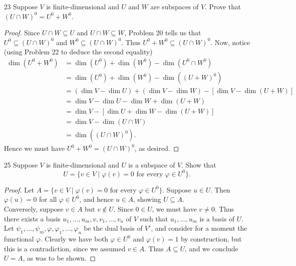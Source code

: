 \documentclass{extarticle}
\newenvironment{problem}[1]{\begin{prob*}{#1}{}}{\end{prob*}}
\begin{document}
\begin{problem}{23}
Suppose $V$ is finite-dimensional and $U$ and $W$ are subspaces of $V$.  Prove that $(U\cap W)^0 = U^0 + W^0$.  
\end{problem}
\begin{proof}
Since $U\cap W\subseteq U$ and $U\cap W \subseteq W$, Problem 20 tells us that $U^0\subseteq (U\cap W)^0$ and $W^0\subseteq (U\cap W)^0$.  Thus $U^0 + W^0\subseteq (U\cap W)^0$.  Now, notice (using Problem 22 to deduce the second equality)
\begin{align*}
\dim(U^0 + W^0) &= \dim(U^0) + \dim(W^0) - \dim(U^0\cap W^0)\\
&= \dim(U^0) + \dim(W^0) - \dim((U+W)^0)\\
&= (\dim V - \dim U) + (\dim V - \dim W) - [\dim V - \dim(U + W)]\\
&= \dim V - \dim U - \dim W + \dim(U + W)\\
&= \dim V - [\dim U + \dim W - \dim(U+W)]\\
&= \dim V - \dim (U\cap W)\\
&= \dim((U\cap W)^0).
\end{align*}
Hence we must have $U^0 + W^0 = (U\cap W)^0$, as desired.
\end{proof}

\begin{problem}{25}
Suppose $V$ is finite-dimensional and $U$ is a subspace of $V$.  Show that
\begin{equation*}
U = \{v\in V\mid \varphi(v) = 0\text{ for every }\varphi\in U^0\}.
\end{equation*}
\end{problem}
\begin{proof}
Let $A = \{v\in V\mid \varphi(v) = 0\text{ for every }\varphi\in U^0\}$.  Suppose $u\in U$.  Then $\varphi(u) = 0$ for all $\varphi\in U^0$, and hence $u\in A$, showing $U \subseteq A$.\\
\indent Conversely, suppose $v \in A$ but $v \not\in U$.  Since $0\in U$, we must have $v \neq 0$. Thus there exists a basis $u_1,\dots,u_m, v, v_1,\dots, v_n$ of $V$ such that $u_1,\dots, u_m$ is a basis of $U$.  Let $\psi_1,\dots,\psi_m, \varphi, \varphi_1,\dots, \varphi_n$ be the dual basis of $V'$, and consider for a moment the functional $\varphi$.  Clearly we have both $\varphi\in U^0$ and $\varphi(v) = 1$ by construction, but this is a contradiction, since we assumed $v\in A$.  Thus $A\subseteq U$, and we conclude $U = A$, as was to be shown. 
\end{proof}
\end{document}
